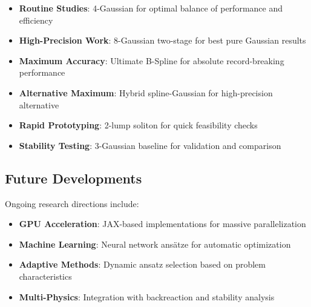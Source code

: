 \documentclass[12pt]{article}
\begin{document}
\begin{itemize}
\item \textbf{Routine Studies}: 4-Gaussian for optimal balance of performance and efficiency
\item \textbf{High-Precision Work}: 8-Gaussian two-stage for best pure Gaussian results
\item \textbf{Maximum Accuracy}: Ultimate B-Spline for absolute record-breaking performance
\item \textbf{Alternative Maximum}: Hybrid spline-Gaussian for high-precision alternative
\item \textbf{Rapid Prototyping}: 2-lump soliton for quick feasibility checks
\item \textbf{Stability Testing}: 3-Gaussian baseline for validation and comparison
\end{itemize}

\subsection{Future Developments}

Ongoing research directions include:
\begin{itemize}
\item \textbf{GPU Acceleration}: JAX-based implementations for massive parallelization
\item \textbf{Machine Learning}: Neural network ansätze for automatic optimization
\item \textbf{Adaptive Methods}: Dynamic ansatz selection based on problem characteristics
\item \textbf{Multi-Physics}: Integration with backreaction and stability analysis
\end{itemize}
\end{document}
